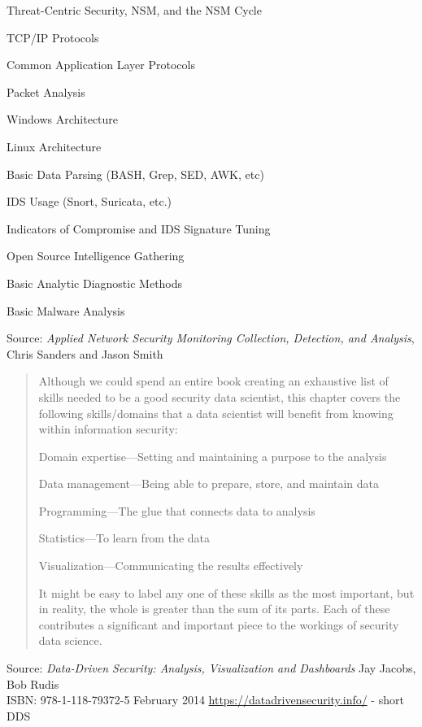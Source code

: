 \documentclass[Screen16to9,17pt]{foils}
\begin{document}
\begin{list2}\small
\item Threat-Centric Security, NSM, and the NSM Cycle
\item TCP/IP Protocols
\item Common Application Layer Protocols
\item Packet Analysis
\item Windows Architecture
\item Linux Architecture
\item Basic Data Parsing (BASH, Grep, SED, AWK, etc)
\item IDS Usage (Snort, Suricata, etc.)
\item Indicators of Compromise and IDS Signature Tuning
\item Open Source Intelligence Gathering
\item Basic Analytic Diagnostic Methods
\item Basic Malware Analysis
\end{list2}

Source: \emph{Applied Network Security Monitoring Collection, Detection, and Analysis}, Chris Sanders and Jason Smith



\begin{quote}
Although we could spend an entire book creating an exhaustive list of skills needed to be a good security data scientist, this chapter covers the following skills/domains that a data scientist will benefit from
knowing within information security:
\begin{list2}
\item Domain expertise—Setting and maintaining a purpose to the analysis
\item Data management—Being able to prepare, store, and maintain data
\item Programming—The glue that connects data to analysis
\item Statistics—To learn from the data
\item Visualization—Communicating the results effectively
\end{list2}
It might be easy to label any one of these skills as the most important, but in reality, the whole is greater than the sum of its parts. Each of these contributes a significant and important piece to the workings of
security data science.
\end{quote}

Source: \emph{Data-Driven Security: Analysis, Visualization and Dashboards} Jay Jacobs, Bob Rudis\\
ISBN: 978-1-118-79372-5 February 2014 \url{https://datadrivensecurity.info/} - short DDS
\end{document}
